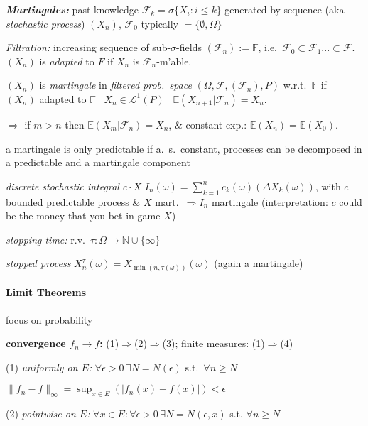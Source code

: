 \documentclass[8pt,twoside]{extarticle}
\begin{document}
\begin{multicols}{2}
\textit{\textbf{Martingales:}} past knowledge $\mathcal{F}_k{=}\sigma\{X_i:i{\leq} k\}$ generated by sequence (aka \textit{stochastic process}) $(X_n)$, $\mathcal{F}_0$ typically $=\{\emptyset, \Omega\}$

\textit{Filtration:} increasing sequence of sub-$\sigma$-fields $(\mathcal{F}_n):=\mathbb{F}$, i.e.\ $\mathcal{F}_0 \subset \mathcal{F}_1 ... \subset \mathcal{F}$. $(X_n)$ is \textit{adapted} to $F$ if $X_n$ is $\mathcal{F}_n$-m'able. 

$(X_n)$ is \textit{martingale} in \textit{filtered prob.\ space} $(\Omega,\mathcal{F}, (\mathcal{F}_n), P)$  w.r.t.\ $\mathbb{F}$ if \hspace{1em}\textbullet \ $(X_n)$ adapted to $\mathbb{F}$ \hspace{1em}\textbullet \ $X_n{\in} \mathcal{L}^1(P)$ \hspace{1em}\textbullet \ $\mathbb{E}(X_{n+1}|\mathcal{F}_n)=X_n$.

$\Rightarrow$ if $m{>}n$ then $\mathbb{E}(X_m|\mathcal{F}_n){=}X_n$, \& constant exp.: $\mathbb{E}(X_n){=}\mathbb{E}(X_0)$.

a martingale is only predictable if a.\ s.\ constant, processes can be decomposed in a predictable and a martingale component

\textit{discrete stochastic integral $c\cdot X$} $I_n(\omega)=\sum_{k=1}^nc_k(\omega)(\Delta X_k(\omega))$, with $c$ bounded predictable process \& $X$ mart.\ $\Rightarrow I_n$ martingale (interpretation: $c$ could be the money that you bet in game $X$)

\textit{stopping time:} r.v.\ $\tau: \Omega \to \mathbb{N}\cup \{\infty\}$ 

\textit{stopped process} $X^\tau_n(\omega)=X_{\min(n,\tau(\omega))}(\omega)$ (again a martingale)


\paragraph{Limit Theorems} focus on probability

\textbf{convergence $f_n{\to} f$:} (1)$\Rightarrow$(2)$\Rightarrow$(3);  finite measures: (1)$\Rightarrow$(4) 

(1) \textit{uniformly on $E$:} $\forall \epsilon{>}0\,\exists N{=}N(\epsilon)$ s.t.\ $\forall n\geq N$ 

\hspace{1.7em}$\|f_n - f\|_{\infty}= \sup_{x\in E}(|f_n(x)-f(x)|) < \epsilon$

(2) \textit{pointwise on $E$:} $\forall x\in E: \forall \epsilon{>}0\,\exists N{=}N(\epsilon,x)$ s.t. $ \forall n\geq N$  


\end{multicols}
\end{document}
